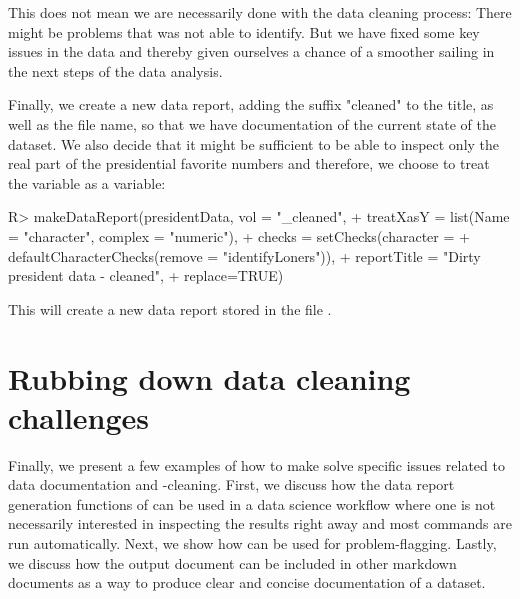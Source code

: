\documentclass[article,shortnames]{jss}
\begin{document}
This does not mean we are necessarily done with the data cleaning process: There might be problems that  was not able to identify. But we have fixed some key issues in the data and thereby given ourselves a chance of a smoother sailing in the next steps of the data analysis. 

Finally, we create a new data report, adding the suffix "cleaned" to the title, as well as the file name, so that we have documentation of the current state of the dataset. We also decide that it might be sufficient to be able to inspect only the real part of the presidential favorite numbers and therefore, we choose to treat the  variable  as a  variable:

\begin{Schunk}
\begin{Sinput}
R> makeDataReport(presidentData, vol = "_cleaned", 
+    treatXasY = list(Name = "character", complex = "numeric"),
+    checks = setChecks(character = 
+    defaultCharacterChecks(remove = "identifyLoners")),
+    reportTitle = "Dirty president data - cleaned",
+    replace=TRUE)
\end{Sinput}
\end{Schunk}

This will create a new data report stored in the file .  

\section{Rubbing down data cleaning challenges}
\label{sec:specificExamples}

Finally, we present a few examples of how to make 
solve specific issues related to data documentation and -cleaning. First, we discuss how the data report generation functions of  can be used in a data science workflow where one is not necessarily interested in inspecting the results right away and most commands are run automatically. Next, we show how  can be used for problem-flagging. Lastly, we discuss how the
 output document can be included in other  markdown
documents as a way to produce clear and concise documentation of a
dataset.
\end{document}
